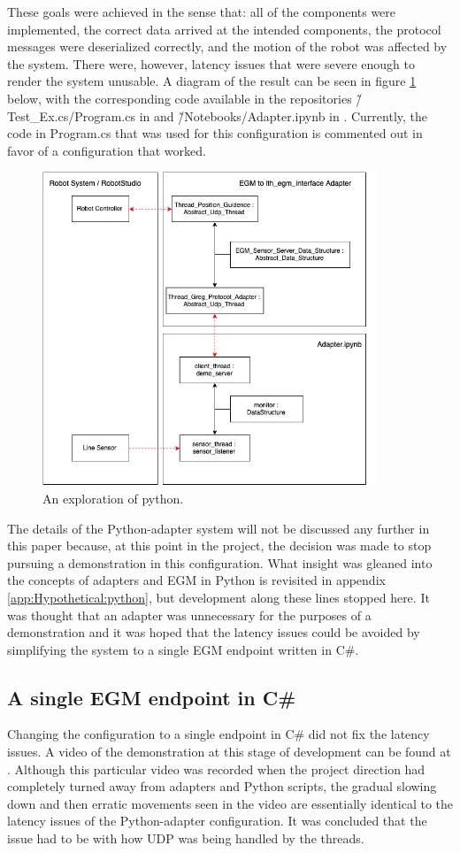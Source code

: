 \documentclass{cslthse-msc}
\begin{document}
These goals were achieved in the sense that: all of the components were implemented, the correct data arrived at the intended components, the protocol messages were deserialized correctly, and the motion of the robot was affected by the system. There were, however, latency issues that were severe enough to render the system unusable. A diagram of the result can be seen in figure \ref{fig:python_adapter} below, with the corresponding code available in the repositories  \~/Test\_Ex.cs/Program.cs in \cite{Greg:LTH_EGM} and \~/Notebooks/Adapter.ipynb in \cite{Greg:Jupyter}. Currently, the code in Program.cs that was used for this configuration is commented out in favor of a configuration that worked. 

\begin{figure}[H]
    \centering
    \includegraphics[width=10cm]{python_adapter.jpg}
    \caption{An exploration of python.}
    \label{fig:python_adapter}
\end{figure}
The details of the Python-adapter system will not be discussed any further in this paper because, at this point in the project, the decision was made to stop pursuing a demonstration in this configuration. What insight was gleaned into the concepts of adapters and EGM in Python is revisited in appendix \ref{app:Hypothetical:python}, but development along these lines stopped here. It was thought that an adapter was unnecessary for the purposes of a demonstration and it was hoped that the latency issues could be avoided by simplifying the system to a single EGM endpoint written in C\#. 

\subsection{A single EGM endpoint in C\#}
\label{sec:Dev:I2:one_endpoint}
Changing the configuration to a single endpoint in C\# did not fix the latency issues. A video of the demonstration at this stage of development can be found at \cite{Greg:Bad_Demo}. Although this particular video was recorded when the project direction had completely turned away from adapters and Python scripts, the gradual slowing down and then erratic movements seen in the video are essentially identical to the latency issues of the Python-adapter configuration. It was concluded that the issue had to be with how UDP was being handled by the threads.
\end{document}
